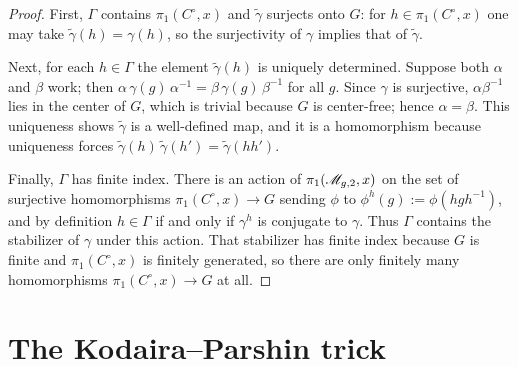 \begin{proof}
  First, \(\Gamma\) contains \(\pi_1(C^\circ, x)\) and \(\widetilde{\gamma}\)
  surjects onto \(G\): for \(h \in \pi_1(C^\circ, x)\) one may take
  \(\widetilde{\gamma}(h) = \gamma(h)\), so the surjectivity of \(\gamma\)
  implies that of \(\widetilde{\gamma}\).

  Next, for each \(h \in \Gamma\) the element \(\widetilde{\gamma}(h)\) is
  uniquely determined. Suppose both \(\alpha\) and \(\beta\) work; then
  \(\alpha\, \gamma(g)\, \alpha^{-1} = \beta\, \gamma(g)\, \beta^{-1}\) for all
  \(g\). Since \(\gamma\) is surjective, \(\alpha \beta^{-1}\) lies in the center
  of \(G\), which is trivial because \(G\) is center-free; hence
  \(\alpha = \beta\). This uniqueness shows \(\widetilde{\gamma}\) is a
  well-defined map, and it is a homomorphism because uniqueness forces
  \(\widetilde{\gamma}(h)\, \widetilde{\gamma}(h') = \widetilde{\gamma}(h h')\).

  Finally, \(\Gamma\) has finite index. There is an action of
  \(\pi_1(\mathscr{M}_{g,2}, x)\) on the set of surjective homomorphisms
  \(\pi_1(C^\circ, x) \to G\) sending \(\phi\) to \(\phi^h(g) := \phi(h g h^{-1})\),
  and by definition \(h \in \Gamma\) if and only if \(\gamma^h\) is conjugate to
  \(\gamma\). Thus \(\Gamma\) contains the stabilizer of \(\gamma\) under this
  action. That stabilizer has finite index because \(G\) is finite and
  \(\pi_1(C^\circ, x)\) is finitely generated, so there are only finitely many
  homomorphisms \(\pi_1(C^\circ, x) \to G\) at all.
\end{proof}

\section{The Kodaira--Parshin trick}

